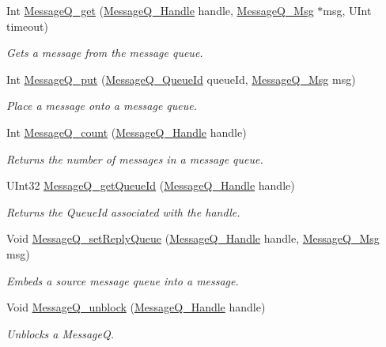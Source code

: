 \begin{DoxyCompactItemize}
Int \hyperlink{_message_q_8h_aaeb270f6b50d96f1e1dd134591ffc380}{Message\-Q\-\_\-get} (\hyperlink{_message_q_8h_a1d584ce08733ca864d81e1e64a41cf7a}{Message\-Q\-\_\-\-Handle} handle, \hyperlink{_message_q_8h_ab675d3cdd0443a1ad05658d375458204}{Message\-Q\-\_\-\-Msg} $\ast$msg, U\-Int timeout)
\begin{DoxyCompactList}\small\item\em Gets a message from the message queue. \end{DoxyCompactList}\item 
Int \hyperlink{_message_q_8h_aa628f9bf897924f61d6adfba3f82fa8d}{Message\-Q\-\_\-put} (\hyperlink{_message_q_8h_a34dd32b58cf0476c2d90e3f702843297}{Message\-Q\-\_\-\-Queue\-Id} queue\-Id, \hyperlink{_message_q_8h_ab675d3cdd0443a1ad05658d375458204}{Message\-Q\-\_\-\-Msg} msg)
\begin{DoxyCompactList}\small\item\em Place a message onto a message queue. \end{DoxyCompactList}\item 
Int \hyperlink{_message_q_8h_a5e2f02d046b2bb16dce6b41f9b4c5ad3}{Message\-Q\-\_\-count} (\hyperlink{_message_q_8h_a1d584ce08733ca864d81e1e64a41cf7a}{Message\-Q\-\_\-\-Handle} handle)
\begin{DoxyCompactList}\small\item\em Returns the number of messages in a message queue. \end{DoxyCompactList}\item 
U\-Int32 \hyperlink{_message_q_8h_af9d9030e493a5a6f961d84900e313623}{Message\-Q\-\_\-get\-Queue\-Id} (\hyperlink{_message_q_8h_a1d584ce08733ca864d81e1e64a41cf7a}{Message\-Q\-\_\-\-Handle} handle)
\begin{DoxyCompactList}\small\item\em Returns the Queue\-Id associated with the handle. \end{DoxyCompactList}\item 
Void \hyperlink{_message_q_8h_a2532f1ebf44ae91a8fd8f63a49e44802}{Message\-Q\-\_\-set\-Reply\-Queue} (\hyperlink{_message_q_8h_a1d584ce08733ca864d81e1e64a41cf7a}{Message\-Q\-\_\-\-Handle} handle, \hyperlink{_message_q_8h_ab675d3cdd0443a1ad05658d375458204}{Message\-Q\-\_\-\-Msg} msg)
\begin{DoxyCompactList}\small\item\em Embeds a source message queue into a message. \end{DoxyCompactList}\item 
Void \hyperlink{_message_q_8h_ae9491bc9f790e267836f27ad2e31d7de}{Message\-Q\-\_\-unblock} (\hyperlink{_message_q_8h_a1d584ce08733ca864d81e1e64a41cf7a}{Message\-Q\-\_\-\-Handle} handle)
\begin{DoxyCompactList}\small\item\em Unblocks a Message\-Q. \end{DoxyCompactList}\end{DoxyCompactItemize}


